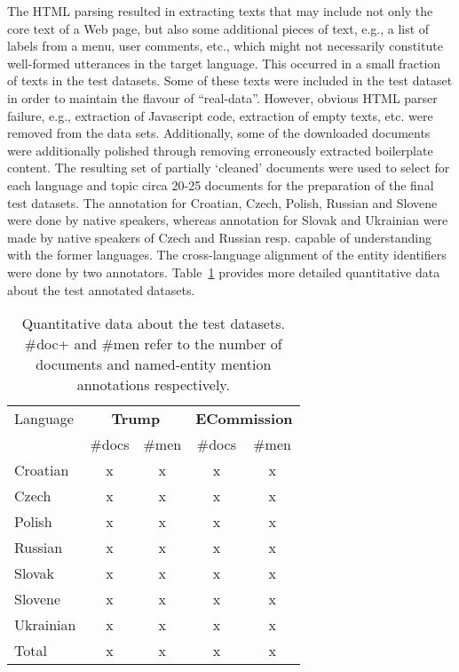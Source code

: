 \documentclass[11pt]{article}
\begin{document}
The HTML parsing resulted in extracting texts that may include not only
the core text of a Web page, but also some additional pieces of text,
e.g., a list of labels from a menu, user comments, etc., which might not
necessarily constitute well-formed utterances in the target language.
This occurred in a small fraction of texts in the test datasets.  Some of
these texts were included in the test dataset in order to maintain the
flavour of “real-data”.  However, obvious HTML parser failure, e.g.,
extraction of Javascript code, extraction of empty texts, etc. were removed
from the data sets.  Additionally, some of the downloaded documents were
additionally polished through removing erroneously extracted boilerplate
content. The resulting set of partially `cleaned' documents were used to
select for each language and topic circa 20-25 documents for the
preparation of the final test datasets. The annotation for Croatian,
Czech, Polish, Russian and Slovene were done by native speakers, whereas
annotation for Slovak and Ukrainian were made by native speakers of Czech
and Russian resp.  capable of understanding with the former
languages. The cross-language alignment of the entity identifiers were
done by two annotators.  Table~\ref{tab:datasets} provides more detailed
quantitative data about the test annotated datasets.

\begin{table}[htbp]
\begin{center}
\begin{footnotesize}
\begin{tabular}{|l||c|c||c|c||}
\hline\hline  
Language & \multicolumn{2}{c||}{\textbf{{\sc Trump}}} & \multicolumn{2}{c||}{\textbf{{\sc ECommission}}} \\ \cline{2-5}
          &  \#docs & \#men & \#docs & \#men \\ \hline\hline
Croatian & x & x & x & x \\
Czech & x & x & x & x \\
Polish & x & x & x & x \\
Russian & x & x & x & x \\
Slovak  & x & x & x & x \\
Slovene & x & x & x & x \\
Ukrainian & x & x & x & x \\
\hline\hline
Total & x & x & x & x  \\
\hline\hline
\end{tabular}
\end{footnotesize}
\end{center}
\caption{Quantitative data about the test datasets. \#doc+ and \#men refer to the number of documents and named-entity mention annotations respectively.}
\label{tab:datasets}
\end{table}
\end{document}

